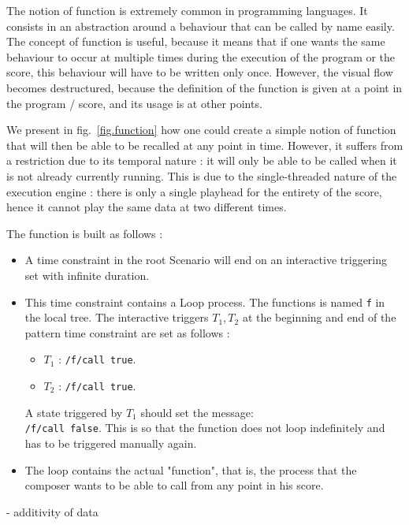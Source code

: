 \documentclass{article}
\begin{document}
The notion of function is extremely common in programming languages.
It consists in an abstraction around a behaviour that can be called 
by name easily.
The concept of function is useful, because it means that 
if one wants the same behaviour to occur at multiple times during
the execution of the program or the score, this behaviour will 
have to be written only once.
However, the visual flow becomes destructured, because 
the definition of the function is given at a point in the program / score, 
and its usage is at other points.

We present in fig.~\ref{fig.function} how one could create a simple 
notion of function that will then be able to be recalled at any point in time.
However, it suffers from a restriction due to its temporal nature : 
it will only be able to be called when it is not already currently running. 
This is due to the single-threaded nature of the execution engine : there is 
only a single playhead for the entirety of the score, hence it cannot play the 
same data at two different times.

The function is built as follows : 
\begin{itemize}
    \item A time constraint in the root Scenario will end on an interactive triggering set with infinite duration.
    \item This time constraint contains a Loop process. 
    The functions is named \verb|f| in the local tree. The interactive triggers $T_1, T_2$ at the beginning and end of the pattern time constraint are set as follows : 
    \begin{itemize}
        \item $T_1$ : \verb|/f/call true|.
        \item $T_2$ : \verb|/f/call true|.
    \end{itemize}
    A state triggered by $T_1$ should set the message:~\\
    \verb|/f/call false|. This is so that the function does not loop 
    indefinitely and has to be triggered manually again.
    \item The loop contains the actual "function", that is, the process that the composer wants to be able to call from any point in his score.
\end{itemize}

- additivity of data 
\end{document}
